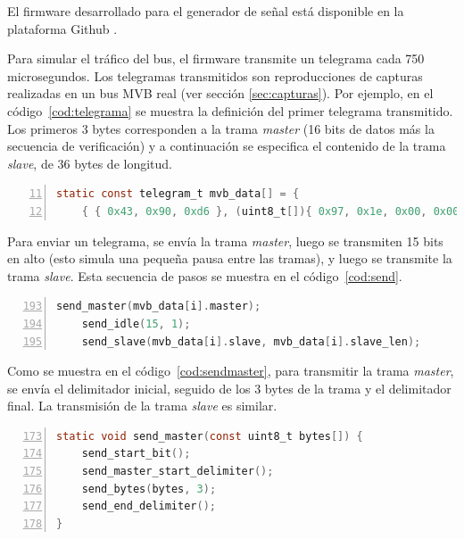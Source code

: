 El firmware desarrollado para el generador de señal está disponible en la plataforma Github \cite{mvbgen}.

Para simular el tráfico del bus, el firmware transmite un telegrama cada 750 microsegundos.
Los telegramas transmitidos son reproducciones de capturas realizadas en un bus MVB real (ver sección \ref{sec:capturas}). Por ejemplo, en el código~\ref{cod:telegrama} se muestra la definición del primer telegrama transmitido.
Los primeros 3 bytes corresponden a la trama \textit{master} (16 bits de datos más la secuencia de verificación) y a continuación se especifica el contenido de la trama \textit{slave}, de 36 bytes de longitud.

\begin{lstlisting}[label=cod:telegrama,caption=Definición de un telegrama a transmitir (\texttt{gen.c}).,float,numberstyle=\footnotesize\ttfamily,language=C,breaklines=true,numbers=left,firstnumber=11,xleftmargin=1cm]
static const telegram_t mvb_data[] = {
    { { 0x43, 0x90, 0xd6 }, (uint8_t[]){ 0x97, 0x1e, 0x00, 0x00, 0x00, 0x82, 0x14, 0x06, 0xdf, 0x1e, 0x0b, 0x31, 0x0f, 0x00, 0x17, 0x05, 0x8c, 0xf8, 0x00, 0x00, 0x00, 0x00, 0x00, 0x00, 0x03, 0x4d, 0xc9, 0x11, 0x94, 0x11, 0xa8, 0x11, 0xa8, 0x04, 0x05, 0x88 }, 36 },
\end{lstlisting}

Para enviar un telegrama, se envía la trama \textit{master}, luego se transmiten 15 bits en alto (esto simula una pequeña pausa entre las tramas), y luego se transmite la trama \textit{slave}. Esta secuencia de pasos se muestra en el código~\ref{cod:send}.

\begin{lstlisting}[label=cod:send,caption=Secuencia de pasos para transmitir un telegrama (\texttt{gen.c}).,float,numberstyle=\footnotesize\ttfamily,language=C,breaklines=true,numbers=left,firstnumber=193,xleftmargin=1cm]
    send_master(mvb_data[i].master);
    send_idle(15, 1);
    send_slave(mvb_data[i].slave, mvb_data[i].slave_len);
\end{lstlisting}

Como se muestra en el código~\ref{cod:sendmaster}, para transmitir la trama \textit{master}, se envía el delimitador inicial, seguido de los 3 bytes de la trama y el delimitador final. La transmisión de la trama \textit{slave} es similar.

\begin{lstlisting}[label=cod:sendmaster,caption=Secuencia de pasos para transmitir la trama \textit{master} (\texttt{gen.c}).,float,numberstyle=\footnotesize\ttfamily,language=C,breaklines=true,numbers=left,firstnumber=173,xleftmargin=1cm]
static void send_master(const uint8_t bytes[]) {
    send_start_bit();
    send_master_start_delimiter();
    send_bytes(bytes, 3);
    send_end_delimiter();
}
\end{lstlisting}

